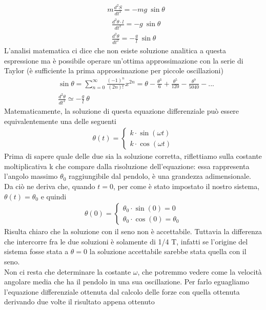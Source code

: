 \begin{align}\label{eq:pendulum}
&m \frac{d^2 S}{dt^2} = -mg\ \sin \theta
\end{align}
\begin{align*}
	&\frac{d^2 \theta \cdot l}{dt^2} = -g\ \sin \theta\\
	&\frac{d^2 \theta}{dt^2} = -\frac{g}{l}\ \sin \theta
\end{align*}
L'analisi matematica ci dice che non esiste soluzione analitica a questa espressione ma è possibile operare un'ottima approssimazione con la serie di Taylor (è sufficiente la prima approssimazione per piccole oscillazioni)
\begin{align*}
&\sin\theta = \sum_{n=0}^{\infty} \frac{(-1)^n}{(2n)!} x^{2n} = \theta- \frac{\theta^3}{6}+\frac{\theta^5}{120}- \frac{\theta^7}{5040}-...\\
&\frac{d^2 \theta}{dt^2} \simeq -\frac{g}{l}\ \theta
\end{align*}
Matematicamente, la soluzione di questa equazione differenziale può essere equivalentemente una delle seguenti
\begin{align*}
	\theta(t)=
	\begin{cases}
		k\cdot \sin(\omega t)\\
		k \cdot \cos(\omega t)
	\end{cases}
\end{align*}
Prima di sapere quale delle due sia la soluzione corretta, riflettiamo sulla costante moltiplicativa k che compare dalla risoluzione dell'equazione: essa rappresenta l'angolo massimo $\theta_0$ raggiungibile dal pendolo, è una grandezza adimensionale. Da ciò ne deriva che, quando $t= 0$, per come è stato impostato il nostro sistema, $\theta (t) = \theta_0$ e quindi 
\begin{align*}
	\theta(0)=
	\begin{cases}
    \theta_0 \cdot \sin(0) = 0\\
    \theta_0 \cdot \cos(0) = \theta_0
	\end{cases}
\end{align*}
Risulta chiaro che la soluzione con il seno non è accettabile. Tuttavia la differenza che intercorre fra le due soluzioni è solamente di 1/4 T, infatti se l'origine del sistema fosse stata a $\theta = 0$ la soluzione accettabile sarebbe stata quella con il seno. \\
Non ci resta che determinare la costante $\omega$, che potremmo vedere come la velocità angolare media che ha il pendolo in una sua oscillazione. Per farlo eguagliamo l'equazione differenziale ottenuta dal calcolo delle forze con quella ottenuta derivando due volte il risultato appena ottenuto
